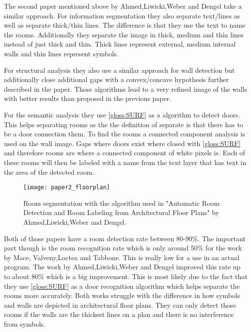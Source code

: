 The second paper mentioned above by Ahmed,Liwicki,Weber and Dengel take a similar approach. For information segmentation they also separate text/lines as well as separate thick/thin lines. The difference is that they use the text to name the rooms. Additionally they separate the image in thick, medium and thin lines instead of just thick and thin. Thick lines represent external, medium internal walls and thin lines represent symbols.

For structural analysis they also use a similar approach for wall detection but additionally close additional gaps with a convex/concave hypothesis further described in the paper. Those algorithms lead to a very refined image of the walls with better results than proposed in the previous paper.

For the semantic analysis they use \ref{gloss:SURF} as a algorithm to detect doors. This helps separating rooms as the the definition of separate is that there has to be a door connection them. To find the rooms a connected component analysis is used on the wall image. Gaps where doors exist where closed with \ref{gloss:SURF} and therefore rooms are where a connected component of white pixels is. Each of these rooms will then be labeled with a name from the text layer that has text in the area of the detected room.

\begin{figure}[h]
	\centering
	\texttt{[image: paper2\_floorplan]}
	\caption{Room segmentation with the algorithm used in "Automatic Room Detection and Room Labeling from Architectural Floor Plans" by Ahmed,Liwicki,Weber and Dengel. }
	\label{fig:paper2_floorplan}
\end{figure}

Both of those papers have a room detection rate between 80-90\%. The important part though is the room recognition rate which is only around 50\% for the work by Mace, Valveny,Loctea and Tabbone. This is really low for a use in an actual program. The work by Ahmed,Liwicki,Weber and Dengel improved this rate up to about 80\% which is a big improvement. This is most likely due to the fact that they use \ref{gloss:SURF} as a door recognition algorithm which helps separate the rooms more accurately. Both works struggle with the difference in how symbols and walls are depicted in architectural floor plans. They can only detect those rooms if the walls are the thickest lines on a plan and there is no interference from symbols.

 

